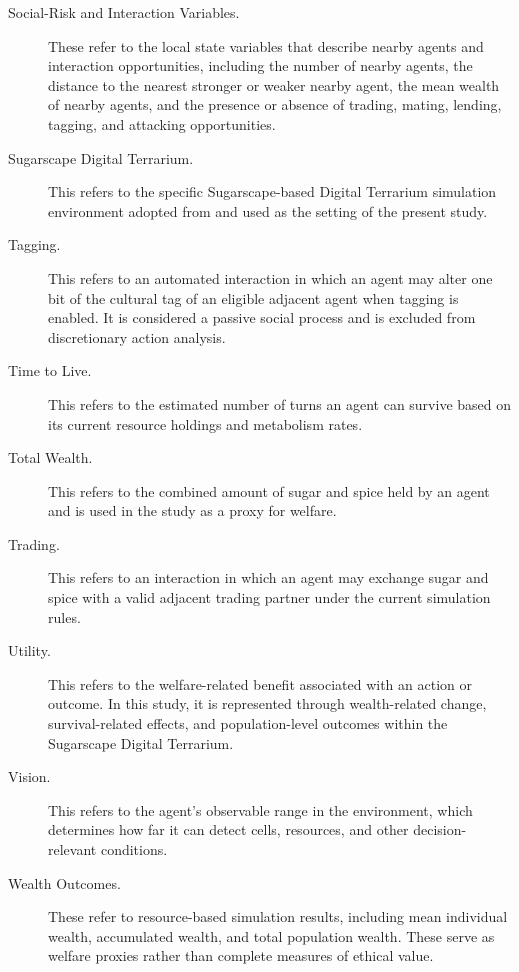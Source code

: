 \documentclass{icsthesis}
\begin{document}
\begin{mainmatter}
\begin{description}
\item[Social-Risk and Interaction Variables.] These refer to the local state variables that describe nearby agents and interaction opportunities, including the number of nearby agents, the distance to the nearest stronger or weaker nearby agent, the mean wealth of nearby agents, and the presence or absence of trading, mating, lending, tagging, and attacking opportunities.

\item[Sugarscape Digital Terrarium.] This refers to the specific Sugarscape-based Digital Terrarium simulation environment adopted from \citet{KremerHerman2024b} and used as the setting of the present study.

\item[Tagging.] This refers to an automated interaction in which an agent may alter one bit of the cultural tag of an eligible adjacent agent when tagging is enabled. It is considered a passive social process and is excluded from discretionary action analysis.

\item[Time to Live.] This refers to the estimated number of turns an agent can survive based on its current resource holdings and metabolism rates.

\item[Total Wealth.] This refers to the combined amount of sugar and spice held by an agent and is used in the study as a proxy for welfare.

\item[Trading.] This refers to an interaction in which an agent may exchange sugar and spice with a valid adjacent trading partner under the current simulation rules.

\item[Utility.] This refers to the welfare-related benefit associated with an action or outcome. In this study, it is represented through wealth-related change, survival-related effects, and population-level outcomes within the Sugarscape Digital Terrarium.

\item[Vision.] This refers to the agent's observable range in the environment, which determines how far it can detect cells, resources, and other decision-relevant conditions.

\item[Wealth Outcomes.] These refer to resource-based simulation results, including mean individual wealth, accumulated wealth, and total population wealth. These serve as welfare proxies rather than complete measures of ethical value.
\end{description}


\end{mainmatter}
\end{document}
